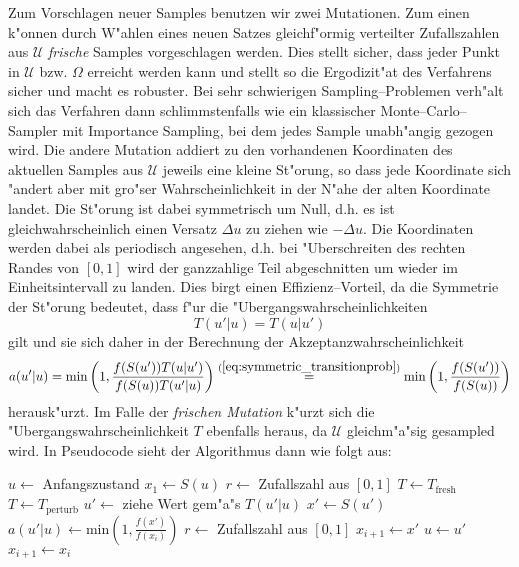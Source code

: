 	Zum Vorschlagen neuer Samples benutzen wir zwei Mutationen. Zum einen k"onnen durch W"ahlen eines neuen Satzes gleichf"ormig verteilter Zufallszahlen aus $\mathcal{U}$ {\em frische} Samples vorgeschlagen werden. Dies stellt sicher, dass jeder Punkt in $\mathcal{U}$ bzw. $\Omega$ erreicht werden kann und stellt so die Ergodizit"at des Verfahrens sicher und macht es robuster. Bei sehr schwierigen Sampling--Problemen verh"alt sich das Verfahren dann schlimmstenfalls wie ein klassischer Monte--Carlo--Sampler mit Importance Sampling, bei dem jedes Sample unabh"angig gezogen wird.
	Die andere Mutation addiert zu den vorhandenen Koordinaten des aktuellen Samples aus $\mathcal{U}$ jeweils eine kleine St"orung, so dass jede Koordinate sich "andert aber mit gro"ser Wahrscheinlichkeit in der N"ahe der alten Koordinate landet. Die St"orung ist dabei symmetrisch um Null, d.h. es ist gleichwahrscheinlich einen Versatz $\Delta u$ zu ziehen wie $-\Delta u$. Die Koordinaten werden dabei als periodisch angesehen, d.h. bei "Uberschreiten des rechten Randes von $[0,1]$ wird der ganzzahlige Teil abgeschnitten um wieder im Einheitsintervall zu landen. Dies birgt einen Effizienz--Vorteil, da die Symmetrie der St"orung bedeutet, dass f"ur die "Ubergangswahrscheinlichkeiten
	\begin{equation}
	  T(u'|u)=T(u|u')
	  \label{eq:symmetric_transitionprob}
	\end{equation}
	gilt und sie sich daher in der Berechnung der Akzeptanzwahrscheinlichkeit
	$$a(u'|u)=\text{min}\left(1,\frac{f(S(u'))T(u|u')}{f(S(u))T(u'|u)}\right)\stackrel{(\ref{eq:symmetric_transitionprob})}{=}\text{min}\left(1,\frac{f(S(u'))}{f(S(u))}\right)$$
	herausk"urzt. Im Falle der {\em frischen Mutation} k"urzt sich die "Ubergangswahrscheinlichkeit $T$ ebenfalls heraus, da $\mathcal{U}$ gleichm"a"sig gesampled wird.
	In Pseudocode sieht der Algorithmus dann wie folgt aus:
	\begin{algorithmic}
		\STATE $u \leftarrow$ Anfangszustand
		\STATE $x_1 \leftarrow S(u)$
			\STATE $r\leftarrow$ Zufallszahl aus $[0,1]$
						\STATE $T \leftarrow T_\text{fresh}$
				\STATE $T \leftarrow T_\text{perturb}$
			\ENDIF
			\STATE $u'\leftarrow$ ziehe Wert gem"a"s $T(u'|u)$
			\STATE $x' \leftarrow S(u')$
			\STATE $a(u'|u) \leftarrow \text{min}\left(1,\frac{f(x')}{f(x_i)}\right)$
			\STATE $r\leftarrow$ Zufallszahl aus $[0,1]$
			  \STATE $x_{i+1} \leftarrow x'$
			  \STATE $u \leftarrow u'$
			\ELSE	\STATE $x_{i+1} \leftarrow x_i$
			\ENDIF
	  \ENDFOR
	\end{algorithmic}

